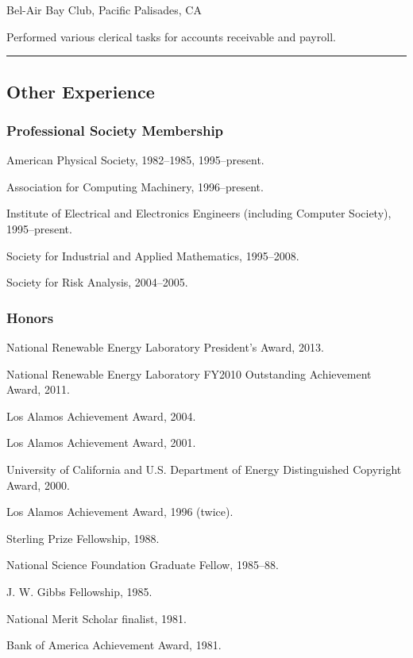 \documentclass[]{article}
\begin{document}
Bel-Air Bay Club, Pacific Palisades, CA

Performed various clerical tasks for accounts receivable and payroll.

\begin{center}\rule{3in}{0.4pt}\end{center}

\subsection{Other Experience}\label{other-experience}

\subsubsection{Professional Society
Membership}\label{professional-society-membership}

American Physical Society, 1982--1985, 1995--present.

Association for Computing Machinery, 1996--present.

Institute of Electrical and Electronics Engineers (including Computer
Society), 1995--present.

Society for Industrial and Applied Mathematics, 1995--2008.

Society for Risk Analysis, 2004--2005.

\subsubsection{Honors}\label{honors}

National Renewable Energy Laboratory President's Award, 2013.

National Renewable Energy Laboratory FY2010 Outstanding Achievement
Award, 2011.

Los Alamos Achievement Award, 2004.

Los Alamos Achievement Award, 2001.

University of California and U.S. Department of Energy Distinguished
Copyright Award, 2000.

Los Alamos Achievement Award, 1996 (twice).

Sterling Prize Fellowship, 1988.

National Science Foundation Graduate Fellow, 1985--88.

J. W. Gibbs Fellowship, 1985.

National Merit Scholar finalist, 1981.

Bank of America Achievement Award, 1981.
\end{document}
